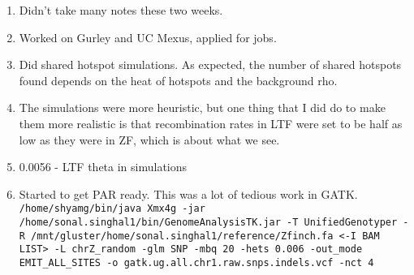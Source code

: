 \documentclass[idxtotoc,hyperref,openany,oneside]{labbook} %
\begin{document}
\begin{enumerate}
\item Didn't take many notes these two weeks.
\item Worked on Gurley and UC Mexus, applied for jobs.
\item Did shared hotspot simulations. As expected, the number of shared hotspots found depends on the heat of hotspots and the background rho.
\item The simulations were more heuristic, but one thing that I did do to make them more realistic is that recombination rates in LTF were set to be half as low as they were in ZF, which is about what we see.
\item  0.0056 - LTF theta in simulations
\item  Started to get PAR ready. This was a lot of tedious work in GATK. \verb+/home/shyamg/bin/java Xmx4g -jar /home/sonal.singhal1/bin/GenomeAnalysisTK.jar -T UnifiedGenotyper -R /mnt/gluster/home/sonal.singhal1/reference/Zfinch.fa <-I BAM LIST> -L chrZ_random -glm SNP -mbq 20 -hets 0.006 -out_mode EMIT_ALL_SITES -o gatk.ug.all.chr1.raw.snps.indels.vcf -nct 4+
\end{enumerate}
\end{document}
